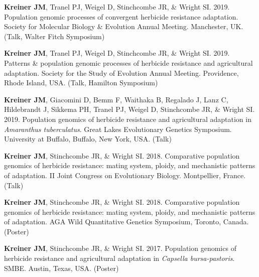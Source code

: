 \documentclass[12pt]{article}
\begin{document}
  \textbf{Kreiner JM}, Tranel PJ, Weigel D, Stinchcombe JR, \& Wright SI. 2019. Population genomic processes of convergent herbicide resistance adaptation. Society for Molecular Biology \& Evolution Annual Meeting. Manchester, UK. (Talk, Walter Fitch Symposium)

  \textbf{Kreiner JM}, Tranel PJ, Weigel D, Stinchcombe JR, \& Wright SI. 2019. Patterns \& population genomic processes of herbicide resistance and agricultural adaptation. Society for the Study of Evolution Annual Meeting. Providence, Rhode Island, USA. (Talk, Hamilton Symposium)

  \textbf{Kreiner JM}, Giacomini D, Bemm F, Waithaka B, Regalado J, Lanz C, Hildebrandt J, Sikkema PH, Tranel PJ, Weigel D, Stinchcombe JR, \& Wright SI. 2019. Population genomics of herbicide resistance and agricultural adaptation in \textit{Amaranthus tuberculatus}. Great Lakes Evolutionary Genetics  Symposium. University at Buffalo, Buffalo, New York, USA. (Talk)


 \textbf{Kreiner JM}, Stinchcombe JR, \& Wright SI. 2018. Comparative population genomics of herbicide resistance: mating system, ploidy, and mechanistic patterns of adaptation. II Joint Congress on Evolutionary Biology. Montpellier, France. (Talk)

 \textbf{Kreiner JM}, Stinchcombe JR, \& Wright SI. 2018. Comparative population genomics of herbicide resistance: mating system, ploidy, and mechanistic patterns of adaptation. AGA Wild Quantitative Genetics Symposium, Toronto, Canada. (Poster)


 \textbf{Kreiner JM}, Stinchcombe JR, \& Wright SI. 2017. Population genomics of herbicide resistance and agricultural adaptation in \textit{Capsella bursa-pastoris}. SMBE. Austin, Texas, USA. (Poster)
\end{document}
